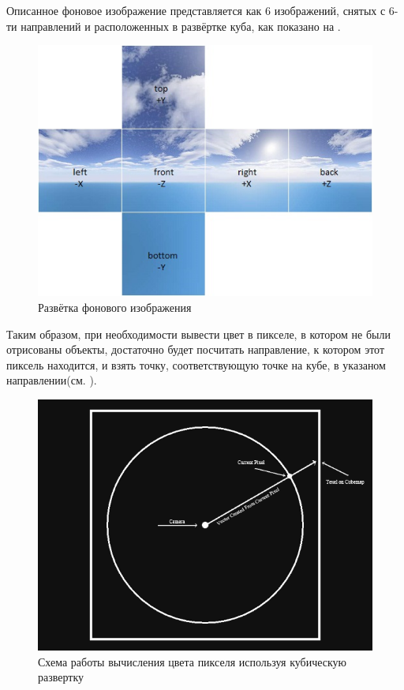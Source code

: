 		Описанное фоновое изображение представляется как 6 изображений, снятых с 6-ти направлений и расположенных в развёртке куба, как показано на .
		
		\begin{figure}[ht!] 
			\center
			\includegraphics [scale=0.4] {my_folder/images//skybox}	
			\caption{Развётка фонового изображения} 
			\label{fig:skybox}
		\end{figure}
		
		Таким образом, при необходимости вывести цвет в пикселе, в котором не были отрисованы объекты, достаточно будет посчитать направление, к котором этот пиксель находится, и взять точку, соответствующую точке на кубе, в указаном направлении(см. ).
		
		\begin{figure}[ht!] 
			\center
			\includegraphics [scale=0.4] {my_folder/images//cube_sample}	
			\caption{Схема работы вычисления цвета пикселя используя кубическую развертку} 
			\label{fig:cube_sample}
		\end{figure}
		
